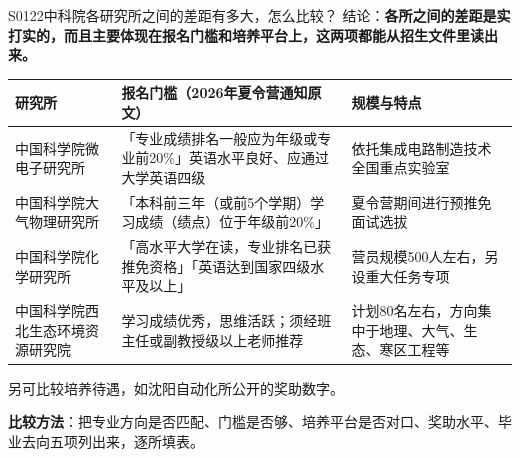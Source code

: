 \begin{qa}{S0122}{中科院各研究所之间的差距有多大，怎么比较？}
结论：\textbf{各所之间的差距是实打实的，而且主要体现在报名门槛和培养平台上，这两项都能从招生文件里读出来。}

\par\vspace{2pt}\nobreak\begin{center}\footnotesize
\begin{tabularx}{\textwidth}{>{\raggedright\arraybackslash}X>{\raggedright\arraybackslash}X>{\raggedright\arraybackslash}X}
\toprule
\textbf{研究所} & \textbf{报名门槛（2026年夏令营通知原文）} & \textbf{规模与特点} \\ \midrule
中国科学院微电子研究所 & 「专业成绩排名一般应为年级或专业前20\%」英语水平良好、应通过大学英语四级 & 依托集成电路制造技术全国重点实验室 \\
中国科学院大气物理研究所 & 「本科前三年（或前5个学期）学习成绩（绩点）位于年级前20\%」 & 夏令营期间进行预推免面试选拔 \\
中国科学院化学研究所 & 「高水平大学在读，专业排名已获推免资格」「英语达到国家四级水平及以上」 & 营员规模500人左右，另设重大任务专项 \\
中国科学院西北生态环境资源研究院 & 学习成绩优秀，思维活跃；须经班主任或副教授级以上老师推荐 & 计划80名左右，方向集中于地理、大气、生态、寒区工程等 \\
\bottomrule
\end{tabularx}
\end{center}\vspace{2pt}\par

另可比较培养待遇，如沈阳自动化所公开的奖助数字。

\textbf{比较方法}：把专业方向是否匹配、门槛是否够、培养平台是否对口、奖助水平、毕业去向五项列出来，逐所填表。
\end{qa}

